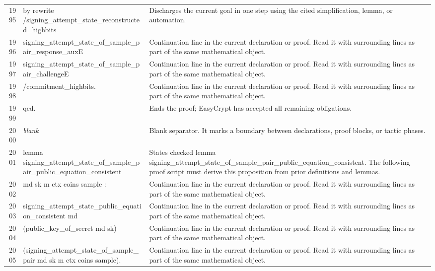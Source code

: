 \documentclass[10pt]{article}
\begin{document}
\begin{longtable}{r L{0.53\textwidth} L{0.37\textwidth}}
1995 & {\ttfamily\scriptsize by rewrite /signing\_attempt\_state\_reconstructed\_highbits} & Discharges the current goal in one step using the cited simplification, lemma, or automation. \\
1996 & {\ttfamily\scriptsize            signing\_attempt\_state\_of\_sample\_pair\_response\_auxE} & Continuation line in the current declaration or proof.  Read it with surrounding lines as part of the same mathematical object. \\
1997 & {\ttfamily\scriptsize            signing\_attempt\_state\_of\_sample\_pair\_challengeE} & Continuation line in the current declaration or proof.  Read it with surrounding lines as part of the same mathematical object. \\
1998 & {\ttfamily\scriptsize            /commitment\_highbits.} & Continuation line in the current declaration or proof.  Read it with surrounding lines as part of the same mathematical object. \\
1999 & {\ttfamily\scriptsize qed.} & Ends the proof; EasyCrypt has accepted all remaining obligations. \\
2000 & {\ttfamily\scriptsize \emph{blank}} & Blank separator.  It marks a boundary between declarations, proof blocks, or tactic phases. \\
2001 & {\ttfamily\scriptsize lemma signing\_attempt\_state\_of\_sample\_pair\_public\_equation\_consistent} & States checked lemma signing\_attempt\_state\_of\_sample\_pair\_public\_equation\_consistent.  The following proof script must derive this proposition from prior definitions and lemmas. \\
2002 & {\ttfamily\scriptsize    md sk m ctx coins sample :} & Continuation line in the current declaration or proof.  Read it with surrounding lines as part of the same mathematical object. \\
2003 & {\ttfamily\scriptsize   signing\_attempt\_state\_public\_equation\_consistent md} & Continuation line in the current declaration or proof.  Read it with surrounding lines as part of the same mathematical object. \\
2004 & {\ttfamily\scriptsize     (public\_key\_of\_secret md sk)} & Continuation line in the current declaration or proof.  Read it with surrounding lines as part of the same mathematical object. \\
2005 & {\ttfamily\scriptsize     (signing\_attempt\_state\_of\_sample\_pair md sk m ctx coins sample).} & Continuation line in the current declaration or proof.  Read it with surrounding lines as part of the same mathematical object. \\

\end{longtable}
\end{document}
